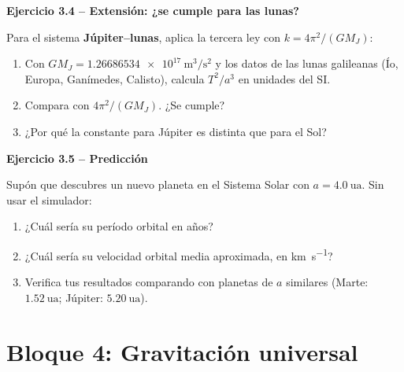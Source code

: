 \documentclass[11pt,a4paper]{article}
\newenvironment{cajaEjercicio}[1][]{\par\medskip\noindent\textbf{#1}\par\smallskip}{\par\medskip}
\theoremstyle{definition}
\begin{document}
\begin{cajaEjercicio}[Ejercicio 3.4 -- Extensión: ¿se cumple para las lunas?]
Para el sistema \textbf{Júpiter--lunas}, aplica la tercera ley con $k = 4\pi^{2}/(GM_{J})$:
\begin{enumerate}[label=\alph*),leftmargin=*]
  \item Con $GM_{J} = \SI{1.26686534e17}{\cubic\metre\per\square\second}$ y los datos de las lunas galileanas (Ío, Europa, Ganímedes, Calisto), calcula $T^{2}/a^{3}$ en unidades del SI.
  \item Compara con $4\pi^{2}/(GM_{J})$. ¿Se cumple?
  \item ¿Por qué la constante para Júpiter es distinta que para el Sol?
\end{enumerate}
\end{cajaEjercicio}

\begin{cajaEjercicio}[Ejercicio 3.5 -- Predicción]
Supón que descubres un nuevo planeta en el Sistema Solar con $a=\SI{4.0}{\astronomicalunit}$. Sin usar el simulador:
\begin{enumerate}[label=\alph*),leftmargin=*]
  \item ¿Cuál sería su período orbital en años?
  \item ¿Cuál sería su velocidad orbital media aproximada, en \si{\kilo\metre\per\second}?
  \item Verifica tus resultados comparando con planetas de $a$ similares (Marte: $\SI{1.52}{\astronomicalunit}$; Júpiter: $\SI{5.20}{\astronomicalunit}$).
\end{enumerate}
\end{cajaEjercicio}

\section{Bloque 4: Gravitación universal}
\end{document}

